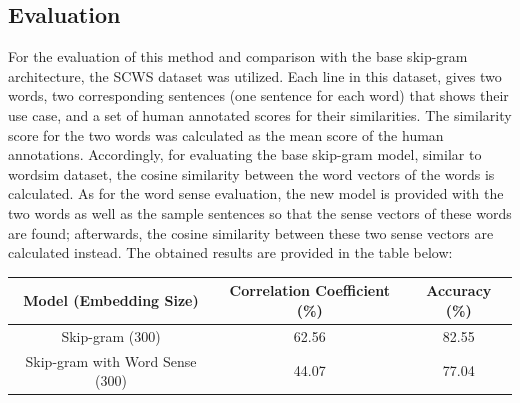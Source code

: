 \documentclass[12pt,a4paper]{article}
\begin{document}
	
	\subsection{Evaluation}
	For the evaluation of this method and comparison with the base skip-gram architecture, the SCWS dataset was utilized. Each line in this dataset, gives two words, two corresponding sentences (one sentence for each word) that shows their use case, and a set of human annotated scores for their similarities. The similarity score for the two words was calculated as the mean score of the human annotations. Accordingly, for evaluating the base skip-gram model, similar to wordsim dataset, the cosine similarity between the word vectors of the words is calculated. As for the word sense evaluation, the new model is provided with the two words as well as the sample sentences so that the sense vectors of these words are found; afterwards, the cosine similarity between these two sense vectors are calculated instead. The obtained results are provided in the table below:
	\begin{table}[H]
		\begin{center}
			\begin{tabular}{|c|c|c|}
				\hline
				Model (Embedding Size) & Correlation Coefficient (\%) & Accuracy (\%) \\ \hline
				Skip-gram (300) &          62.56     & 82.55      \\ \hline
				Skip-gram with Word Sense (300) &  44.07    &  77.04       \\ 
				\hline             
			\end{tabular}
		\end{center}
	\end{table}
\end{document}
